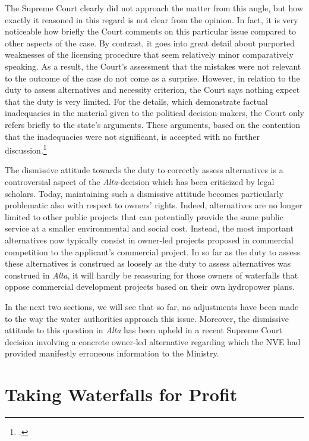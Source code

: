 The Supreme Court clearly did not approach the matter from this angle, but how exactly it reasoned in this regard is not clear from the opinion. In fact, it is very noticeable how briefly the Court comments on this particular issue compared to other aspects of the case. By contrast, it goes into great detail about purported weaknesses of the licensing procedure that seem relatively minor comparatively speaking. As a result, the Court's assessment that the mistakes were not relevant to the outcome of the case do not come as a surprise. However, in relation to the duty to assess alternatives and necessity criterion, the Court says nothing expect that the duty is very limited. For the details, which demonstrate factual inadequacies in the material given to the political decision-makers, the Court only refers briefly to the state's arguments. These arguments, based on the contention that the inadequacies were not significant, is accepted with no further discussion.\footcite[346]{alta82}

The dismissive attitude towards the duty to correctly assess alternatives is a controversial aspect of the {\it Alta}-decision which has been criticized by legal scholars. Today, maintaining such a dismissive attitude becomes particularly problematic also with respect to owners' rights. Indeed, alternatives are no longer limited to other public projects that can potentially provide the same public service at a smaller environmental and social cost. Instead, the most important alternatives now typically consist in owner-led projects proposed in commercial competition to the applicant's commercial project. In so far as the duty to assess these alternatives is construed as loosely as the duty to assess alternatives was construed in {\it Alta}, it will hardly be reassuring for those owners of waterfalls that oppose commercial development projects based on their own hydropower plans. 

In the next two sections, we will see that so far, no adjustments have been made to the way the water authorities approach this issue. Moreover, the dismissive attitude to this question in {\it Alta} has been upheld in a recent Supreme Court decision involving a concrete owner-led alternative regarding which the NVE had provided manifestly erroneous information to the Ministry.

\section{Taking Waterfalls for Profit}

